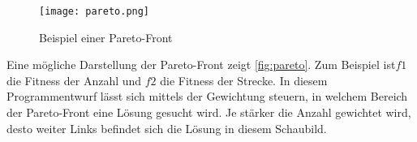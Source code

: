 \begin{figure}[h]
    \centering
    \texttt{[image: pareto.png]}
    \caption{Beispiel einer Pareto-Front \cite{Paretofr62:online}}
    \label{fig:pareto}
\end{figure}

Eine mögliche Darstellung der Pareto-Front zeigt \autoref{fig:pareto}.
Zum Beispiel ist$f1$ die Fitness der Anzahl und $f2$ die Fitness der Strecke.
In diesem Programmentwurf lässt sich mittels der Gewichtung steuern,
in welchem Bereich der Pareto-Front eine Lösung gesucht wird.
Je stärker die Anzahl gewichtet wird, desto weiter Links befindet sich die Lösung in diesem Schaubild.
